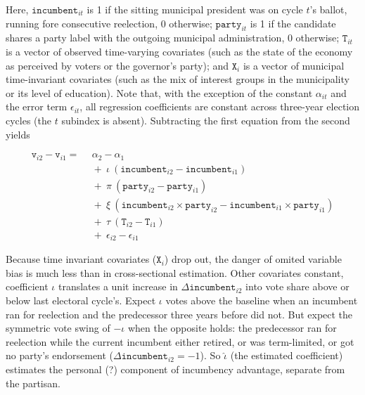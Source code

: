 \documentclass[letter,12pt]{article}
\newcommand{\vn}[1]{\vnform{#1}}      %
\newcommand{\vnform}[1]{\mathtt{#1}}  %
\begin{document}
\noindent Here, $\vn{incumbent}_{it}$ is 1 if the sitting municipal president was on cycle $t$'s ballot, running fore consecutive reelection, 0 otherwise; $\vn{party}_{it}$ is 1 if the candidate shares a party label with the outgoing municipal administration, 0 otherwise; $\vn{T}_{it}$ is a vector of observed time-varying covariates (such as the state of the economy as perceived by voters or the governor's party); and $\vn{X}_i$ is a vector of municipal time-invariant covariates (such as the mix of interest groups in the municipality or its level of education). Note that, with the exception of the constant $\alpha_{it}$ and the error term $\epsilon_{it}$, all regression coefficients are constant across three-year election cycles (the $t$ subindex is absent). Subtracting the first equation from the second yields

\begin{equation}
\begin{split}
  \vn{v}_{i2} - \vn{v}_{i1} =  & ~~\alpha_2 - \alpha_1 \\
                               & ~~+~\iota~(\vn{incumbent}_{i2} - \vn{incumbent}_{i1}) \\
                               & ~~+~\pi~(\vn{party}_{i2} - \vn{party}_{i1}) \\
                               & ~~+~\xi~(\vn{incumbent}_{i2} \times \vn{party}_{i2} - \vn{incumbent}_{i1} \times \vn{party}_{i1}) \\
                               & ~~+~\tau~(\vn{T}_{i2} - \vn{T}_{i1}) \\
                               & ~~+~\epsilon_{i2} - \epsilon_{i1}
\end{split}
\end{equation}

\noindent Because time invariant covariates ($\vn{X}_i$) drop out, the danger of omited variable bias is much less than in cross-sectional estimation. Other covariates constant, coefficient $\iota$ translates a unit increase in $\Delta \vn{incumbent}_{i2}$ into vote share above or below last electoral cycle's. Expect $\iota$ votes above the baseline when an incumbent ran for reelection and the predecessor three years before did not. But expect the symmetric vote swing of $-\iota$ when the opposite holds: the predecessor ran for reelection while the current incumbent either retired, or was term-limited, or got no party's endorsement ($\Delta \vn{incumbent}_{i2}=-1$). So $\hat{\iota}$ (the estimated coefficient) estimates the personal (?) component of incumbency advantage, separate from the partisan.
\end{document}
